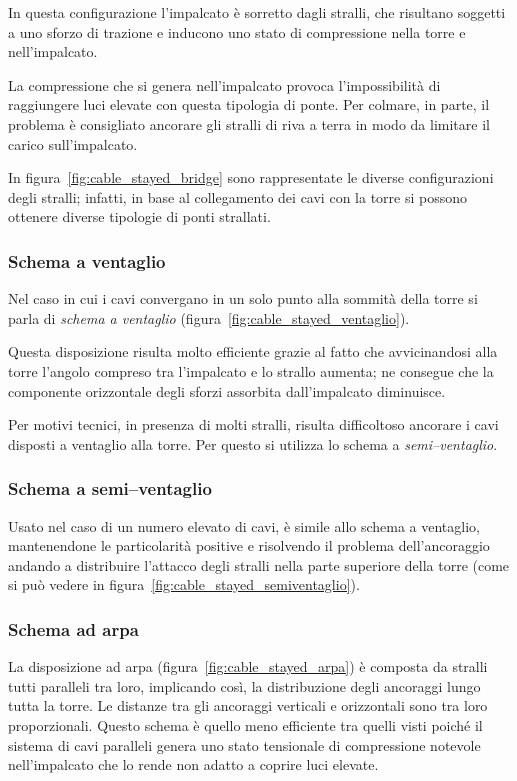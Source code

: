 In questa configurazione l'impalcato è sorretto dagli stralli, che risultano soggetti a uno sforzo di trazione e inducono uno stato di compressione nella torre e nell'impalcato.

La compressione che si genera nell'impalcato provoca l'impossibilità di raggiungere luci elevate con questa tipologia di ponte. Per colmare, in parte, il problema è consigliato ancorare gli stralli di riva a terra in modo da limitare il carico sull'impalcato.



In figura~\ref{fig:cable_stayed_bridge} sono rappresentate le diverse configurazioni degli stralli; infatti, in base al collegamento dei cavi con la torre si possono ottenere diverse tipologie di ponti strallati.
\subsubsection{Schema a ventaglio}

Nel caso in cui i cavi convergano in un solo punto alla sommità della torre si parla di \emph{schema a ventaglio} (figura~\ref{fig:cable_stayed_ventaglio}).

Questa disposizione risulta molto efficiente grazie al fatto che avvicinandosi alla torre l'angolo compreso tra l'impalcato e lo strallo aumenta; ne consegue che la componente orizzontale degli sforzi assorbita dall'impalcato diminuisce. 

Per motivi tecnici, in presenza di molti stralli, risulta difficoltoso ancorare i cavi disposti a ventaglio alla torre. Per questo si utilizza lo schema a \emph{semi--ventaglio}.

\subsubsection{Schema a semi--ventaglio}
Usato nel caso di un numero elevato di cavi, è simile allo schema a ventaglio, mantenendone le particolarità positive e risolvendo il problema dell'ancoraggio andando a distribuire l'attacco degli stralli nella parte superiore della torre (come si può vedere in figura~\ref{fig:cable_stayed_semiventaglio}).

\subsubsection{Schema ad arpa}
La disposizione ad arpa (figura~\ref{fig:cable_stayed_arpa}) è composta da stralli tutti paralleli tra loro, implicando così, la distribuzione degli ancoraggi lungo tutta la torre.
Le distanze tra gli ancoraggi verticali e orizzontali sono tra loro proporzionali.
Questo schema è quello meno efficiente tra quelli visti poiché il sistema di cavi paralleli genera uno stato tensionale di compressione notevole nell'impalcato che lo rende non adatto a coprire luci elevate.







 


